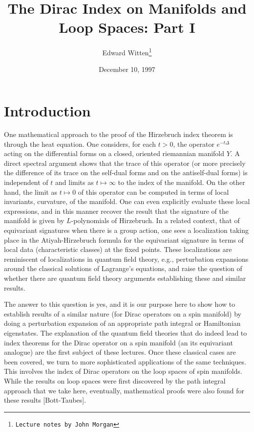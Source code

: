 \title{The Dirac Index on Manifolds and Loop Spaces: Part I}
\author{Edward Witten\thanks{\tt{Lecture notes by John Morgan}}}
\date{December 10, 1997}


\maketitle

\section{Introduction}

One mathematical approach
to the proof of the Hirzebruch index theorem 
is through the  heat equation.  One considers, for each $t>0$, the
operator $e^{-t\Delta}$ acting on the differential forms on a closed,
oriented riemannian manifold $Y$. A direct spectral argument shows
that the trace of this operator (or more precisely the difference of
its trace on the self-dual forms and on the antiself-dual forms) is
independent of $t$ and limits as $t\mapsto \infty$ to the index of the
manifold. On the other hand, the limit as $t\mapsto 0$ of this
operator can be computed in terms of local invariants, curvature, of
the manifold.  One can even explicitly evaluate these local
expressions, and in this manner recover  the result that the signature
of the manifold is given by $L$-polynomials of Hirzebruch.  In a
related context, that of equivariant signatures when there is a group
action, one sees a localization taking place in the Atiyah-Hirzebruch
formula for the equivariant signature in terms of local data
(characteristic classes) at the fixed points.
These localizations are reminiscent of localizations in quantum field
theory, e.g., perturbation expansions around the classical solutions
of Lagrange's equations, and raise the question of whether there are
quantum field theory arguments establishing these and similar
results. 

The answer to this question is yes, and 
it is our purpose here to show how to establish results  of a similar
nature (for Dirac operators on a spin manifold) by
doing a perturbation expansion of an 
appropriate path integral or Hamiltonian eigenstates.  The explanation
of the quantum field theories that do indeed lead 
to index theorems for the Dirac operator on a
spin manifold (an its equivariant analogue) are the first subject of
these lectures. Once these classical cases are been covered, we turn
to more sophisticated applications of the same techniques.  This
involves the index of Dirac operators on the loop spaces of spin
manifolds. While the results on loop spaces were first discovered by
the path integral approach that we take here,  eventually,
mathematical proofs were also found for these results [Bott-Taubes].


